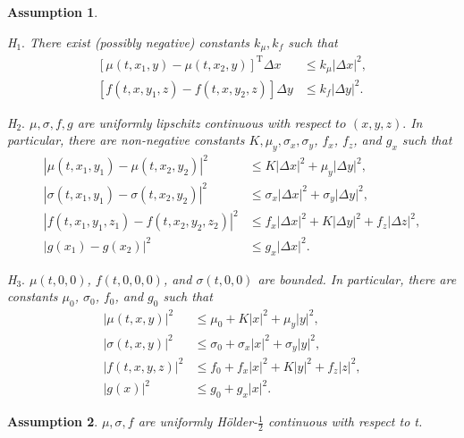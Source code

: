 \documentclass[11pt]{article}
\newtheorem{assumption}{Assumption}
\begin{document}
\begin{assumption}\label{assumption_1}
\

H$_1.$ There exist (possibly negative) constants $k_\mu, k_f$ such that
$$
\begin{aligned}
\left[\mu(t,x_1,y)-\mu(t,x_2,y)\right]^\mathrm{T}\Delta x&\leq k_\mu|\Delta x|^2,\\
\left[f(t,x,y_1,z)-f(t,x,y_2,z)\right]\Delta y&\leq k_f|\Delta y|^2.
\end{aligned}
$$

H$_2.$ $\mu, \sigma, f, g$ are uniformly lipschitz continuous with respect $to$ $( x, y, z).$ In particular,
there are non-negative constants $K, \mu_y, \sigma_x, \sigma_y$, $f_x$, $f_z$, and $g_x$ such that
$$
\begin{aligned}
|\mu(t,x_1,y_1)-\mu(t,x_2,y_2)|^2 &\leq K|\Delta x|^2+\mu_y|\Delta y|^2,\\
|\sigma(t,x_{1},y_{1})-\sigma(t,x_{2},y_{2})|^{2}&\leq\sigma_{x}|\Delta x|^{2}+\sigma_{y}|\Delta y|^{2},\\
|f(t,x_1,y_1,z_1)-f(t,x_2,y_2,z_2)|^2&\leq f_x|\Delta x|^2+K|\Delta y|^2+f_z|\Delta z|^2,\\
|g(x_1)-g(x_2)|^2&\leq g_x|\Delta x|^2.
\end{aligned}
$$

H$_3.$ $\mu( t, 0, 0) $, $f( t, 0, 0, 0) $, and $\sigma ( t, 0, 0)$ are bounded. In particular, there are constants $\mu_{0}$, $\sigma _{0}$, $f_{0}$, and $g_{0}$ such that
$$\begin{aligned}|\mu(t,x,y)|^{2}&\leq \mu_{0}+K|x|^{2}+\mu_{y}|y|^{2},\\
	|\sigma(t,x,y)|^{2}&\leq\sigma_{0}+\sigma_{x}|x|^{2}+\sigma_{y}|y|^{2},\\|f(t,x,y,z)|^{2}&\leq f_{0}+f_{x}|x|^{2}+K|y|^{2}+f_{z}|z|^{2},\\|g(x)|^{2}&\leq g_{0}+g_{x}|x|^{2}.\end{aligned}$$
\end{assumption}


\begin{assumption}\label{assumption_2}
$\mu, \sigma, f$ are uniformly Hölder-$\frac12$ continuous with respect to t.
\end{assumption}
\end{document}
